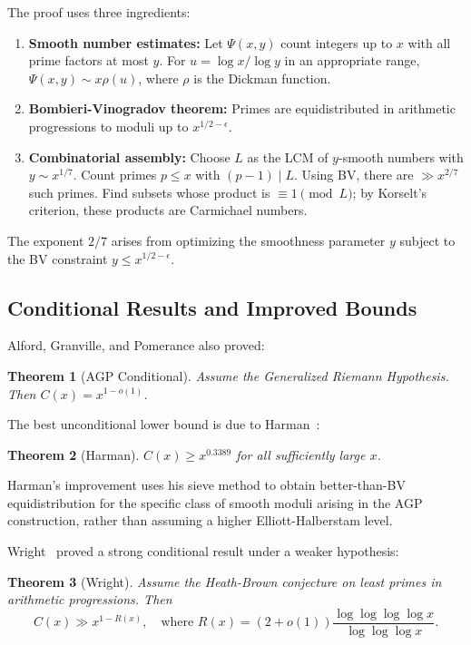 \documentclass{amsart}
\theoremstyle{plain}
\newtheorem{theorem}{Theorem}[section]
\theoremstyle{definition}
\theoremstyle{remark}
\begin{document}
The proof uses three ingredients:
\begin{enumerate}
\item \textbf{Smooth number estimates:} Let $\Psi(x, y)$ count integers up to $x$ with all prime factors at most $y$. For $u = \log x / \log y$ in an appropriate range, $\Psi(x, y) \sim x \rho(u)$, where $\rho$ is the Dickman function.

\item \textbf{Bombieri-Vinogradov theorem:} Primes are equidistributed in arithmetic progressions to moduli up to $x^{1/2 - \epsilon}$.

\item \textbf{Combinatorial assembly:} Choose $L$ as the LCM of $y$-smooth numbers with $y \sim x^{1/7}$. Count primes $p \le x$ with $(p-1) \mid L$. Using BV, there are $\gg x^{2/7}$ such primes. Find subsets whose product is $\equiv 1 \pmod{L}$; by Korselt's criterion, these products are Carmichael numbers.
\end{enumerate}

The exponent $2/7$ arises from optimizing the smoothness parameter $y$ subject to the BV constraint $y \le x^{1/2 - \epsilon}$.

\subsection{Conditional Results and Improved Bounds}

Alford, Granville, and Pomerance also proved:

\begin{theorem}[AGP Conditional]\label{thm:agp-conditional}
Assume the Generalized Riemann Hypothesis. Then $C(x) = x^{1 - o(1)}$.
\end{theorem}

The best unconditional lower bound is due to Harman~\cite{harman2005,harman2008}:

\begin{theorem}[Harman]\label{thm:harman}
$C(x) \ge x^{0.3389}$ for all sufficiently large $x$.
\end{theorem}

Harman's improvement uses his sieve method to obtain better-than-BV equidistribution for the specific class of smooth moduli arising in the AGP construction, rather than assuming a higher Elliott-Halberstam level.

Wright~\cite{wright2020} proved a strong conditional result under a weaker hypothesis:

\begin{theorem}[Wright]\label{thm:wright}
Assume the Heath-Brown conjecture on least primes in arithmetic progressions. Then
\[
C(x) \gg x^{1 - R(x)}, \quad \text{where } R(x) = (2 + o(1)) \frac{\log \log \log \log x}{\log \log \log x}.
\]
\end{theorem}
\end{document}
